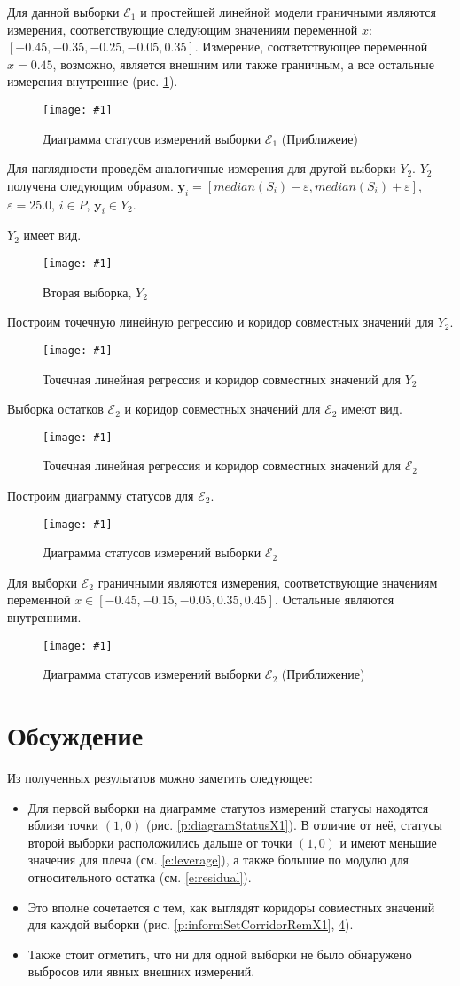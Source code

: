 \documentclass[a4paper,12pt]{article}
\newcommand{\plot}[3]{
    \begin{figure}[H]
        \begin{center}
            \texttt{[image: \#1]}
            \caption{#2}
            \label{#3}
        \end{center}
    \end{figure}
}
\begin{document}
    Для данной выборки $ \mathcal{E}_1 $ и простейшей линейной модели граничными являются
    измерения, соответствующие следующим значениям переменной $ x $: $ [-0.45, -0.35, -0.25, -0.05, 0.35] $.
    Измерение, соответствующее переменной $ x = 0.45 $, возможно, является внешним или также граничным,
    а все остальные измерения внутренние (рис. \ref{p:diagramStatusZoomX1}).
    \plot{DiagramStatusZoomX1}{Диаграмма статусов измерений выборки $ \mathcal{E}_1 $ (Приближеие)}{p:diagramStatusZoomX1}

    Для наглядности проведём аналогичные измерения для другой выборки $ Y_2 $.
    $ Y_2 $ получена следующим образом. $ \textbf{y}_i = [median(S_i) - \varepsilon, median(S_i) + \varepsilon] $,
    $ \varepsilon = 25.0 $, $ i \in P $, $ \textbf{y}_i \in Y_2 $. 

    $ Y_2 $ имеет вид.
    \plot{SampleX2}{Вторая выборка, $ Y_2 $}{p:sampleX2}

    Построим точечную линейную регрессию и коридор совместных значений для $ Y_2 $.
    \plot{InformSetCorridorX2}{Точечная линейная регрессия и коридор совместных значений для $ Y_2 $}{p:informSetCorridorX2}

    Выборка остатков $ \mathcal{E}_2 $ и коридор совместных значений для $ \mathcal{E}_2 $ имеют вид.
    \plot{InformSetCorridorRemX2}{Точечная линейная регрессия и коридор совместных значений для $ \mathcal{E}_2 $}{p:informSetCorridorRemX2}

    Построим диаграмму статусов для $ \mathcal{E}_2 $.
    \plot{DiagramStatusX2}{Диаграмма статусов измерений выборки $ \mathcal{E}_2 $}{p:diagramStatusX2}

    Для выборки $ \mathcal{E}_2 $ граничными являются измерения, соответствующие значениям
    переменной $ x \in [-0.45, -0.15, -0.05, 0.35, 0.45] $.
    Остальные являются внутренними.
    \plot{DiagramStatusZoomX2}{Диаграмма статусов измерений выборки $ \mathcal{E}_2 $ (Приближение)}{p:diagramStatusZoomX2}

    \section{Обсуждение}
    \quad Из полученных результатов можно заметить следующее:
    \begin{itemize}
    \item Для первой выборки на диаграмме статутов измерений статусы находятся вблизи точки $ (1, 0) $ (рис. \ref{p:diagramStatusX1}). В отличие от неё, статусы второй выборки расположились дальше от точки $ (1, 0) $ и
    имеют меньшие значения для плеча (см. \ref{e:leverage}), а также большие по модулю для относительного остатка (см. \ref{e:residual}).
    \item Это вполне сочетается с тем, как выглядят коридоры совместных значений для каждой выборки
    (рис. \ref{p:informSetCorridorRemX1}, \ref{p:informSetCorridorRemX2}).
    \item Также стоит отметить, что ни для одной выборки не было обнаружено выбросов или явных внешних измерений.
    \end{itemize}
\end{document}
